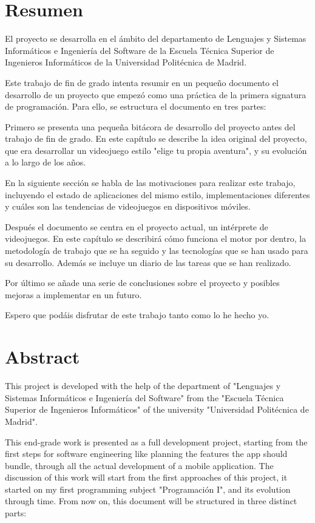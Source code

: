 \chapter*{Resumen}

El proyecto se desarrolla en el \'ambito del departamento de Lenguajes y Sistemas Inform\'aticos e Ingenier\'ia del Software de la Escuela T\'ecnica Superior de Ingenieros Inform\'aticos de la Universidad Polit\'ecnica de Madrid.

Este trabajo de fin de grado intenta resumir en un pequeño documento el desarrollo de un proyecto que empez\'o como una pr\'actica de la primera signatura de programaci\'on.
Para ello, se estructura el documento en tres partes:

Primero se presenta una pequeña bit\'acora de desarrollo del proyecto antes del trabajo de fin de grado. En este cap\'itulo se describe la idea original del proyecto, que era desarrollar un videojuego estilo "elige tu propia aventura", y su evoluci\'on a lo largo de los años.

En la siguiente secci\'on se habla de las motivaciones para realizar este trabajo, incluyendo el estado de aplicaciones del mismo estilo, implementaciones diferentes y cu\'ales son las tendencias de videojuegos en dispositivos m\'oviles.

Despu\'es el documento se centra en el proyecto actual, un int\'erprete de videojuegos. En este capítulo se describirá cómo funciona el motor por dentro, la metodolog\'ia de trabajo que se ha seguido y las tecnolog\'ias que se han usado para su desarrollo. Además se incluye un diario de las tareas que se han realizado.

Por \'ultimo se añade una serie de conclusiones sobre el proyecto y posibles mejoras a implementar en un futuro.

Espero que podáis disfrutar de este trabajo tanto como lo he hecho yo.

\newpage

\chapter*{Abstract}

This project is developed with the help of the department of "Lenguajes y Sistemas Inform\'aticos e Ingenier\'ia del Software" from the "Escuela T\'ecnica Superior de Ingenieros Inform\'aticos" of the university "Universidad Politécnica de Madrid".

This end-grade work is presented as a full development project, starting from the first steps for software engineering like planning the features the app should bundle, through all the actual development of a mobile application. The discussion of this work will start from the first approaches of this project, it started on my first programming subject "Programación I", and its evolution through time.
From now on, this document will be structured in three distinct parts:

